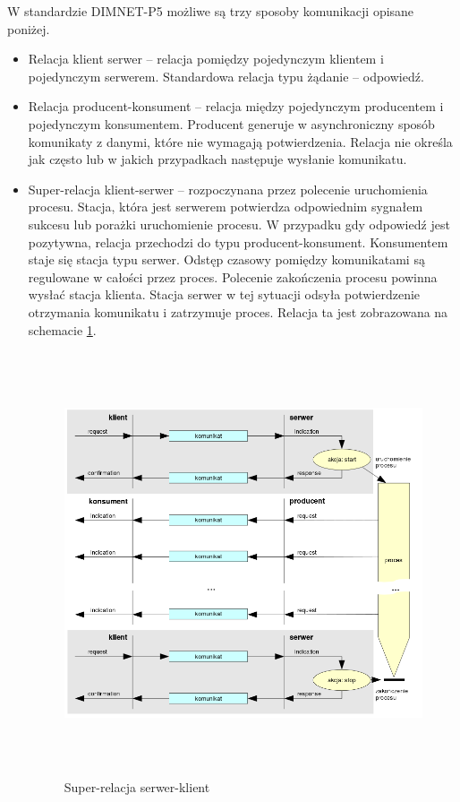 W standardzie \mbox{DIMNET-P5} możliwe są trzy sposoby komunikacji opisane poniżej.
\begin{itemize}
\item Relacja klient serwer -- relacja pomiędzy pojedynczym klientem i pojedynczym serwerem. Standardowa relacja typu żądanie -- odpowiedź.
\item Relacja producent-konsument -- relacja między pojedynczym producentem i pojedynczym konsumentem. Producent generuje w asynchroniczny sposób komunikaty z danymi, które nie wymagają potwierdzenia. Relacja nie określa jak często lub w jakich przypadkach następuje wysłanie komunikatu.
\item Super-relacja klient-serwer -- rozpoczynana przez polecenie uruchomienia procesu. Stacja, która jest serwerem potwierdza odpowiednim sygnałem sukcesu lub porażki uruchomienie procesu. W przypadku gdy odpowiedź jest pozytywna, relacja przechodzi do typu producent-konsument. Konsumentem staje się stacja typu serwer. Odstęp czasowy pomiędzy komunikatami są regulowane w całości przez proces. Polecenie zakończenia procesu powinna wysłać stacja klienta. Stacja serwer w tej sytuacji odsyła potwierdzenie otrzymania komunikatu i zatrzymuje proces. Relacja ta jest zobrazowana na schemacie \ref{fig:dimnetp5}.

	\begin{figure}[t]
		\centerline{\includegraphics[height=125mm]{./img/dimnet-p5.png}}
		\caption[Super-relacja serwer-klient]{Super-relacja serwer-klient \cite{arex-materials}}
		\label{fig:dimnetp5}
	\end{figure}
\end{itemize}

